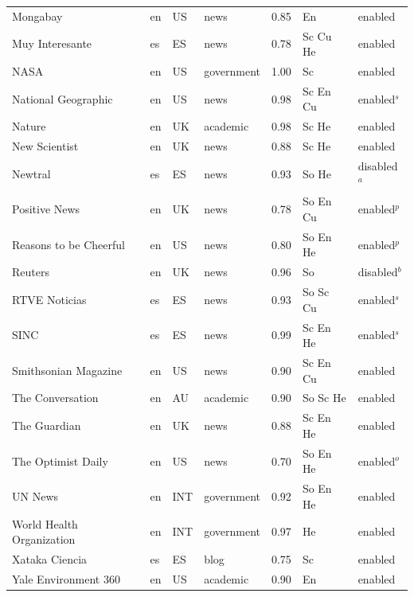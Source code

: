 {\begin{longtable}{@{}lllllll@{}}
Mongabay                   & en & US  & news       & 0.85 & En           & enabled \\
Muy Interesante            & es & ES  & news       & 0.78 & Sc Cu He     & enabled \\
NASA                       & en & US  & government & 1.00 & Sc           & enabled \\
National Geographic        & en & US  & news       & 0.98 & Sc En Cu     & enabled$^{s}$ \\
Nature                     & en & UK  & academic   & 0.98 & Sc He        & enabled \\
New Scientist              & en & UK  & news       & 0.88 & Sc He        & enabled \\
Newtral                    & es & ES  & news       & 0.93 & So He        & disabled$^{a}$ \\
Positive News              & en & UK  & news       & 0.78 & So En Cu     & enabled$^{p}$ \\
Reasons to be Cheerful     & en & US  & news       & 0.80 & So En He     & enabled$^{p}$ \\
Reuters                    & en & UK  & news       & 0.96 & So           & disabled$^{b}$ \\
RTVE Noticias              & es & ES  & news       & 0.93 & So Sc Cu     & enabled$^{s}$ \\
SINC                       & es & ES  & news       & 0.99 & Sc En He     & enabled$^{s}$ \\
Smithsonian Magazine       & en & US  & news       & 0.90 & Sc En Cu     & enabled \\
The Conversation           & en & AU  & academic   & 0.90 & So Sc He     & enabled \\
The Guardian               & en & UK  & news       & 0.88 & Sc En He     & enabled \\
The Optimist Daily         & en & US  & news       & 0.70 & So En He     & enabled$^{o}$ \\
UN News                    & en & INT & government & 0.92 & So En He     & enabled \\
World Health Organization  & en & INT & government & 0.97 & He           & enabled \\
Xataka Ciencia             & es & ES  & blog       & 0.75 & Sc           & enabled \\
Yale Environment 360       & en & US  & academic   & 0.90 & En           & enabled \\
\end{longtable}
}

